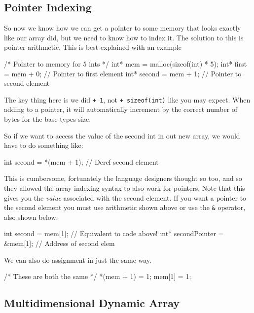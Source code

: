 \subsection{Pointer Indexing}

So now we know how we can get a pointer to some memory that looks exactly like our array did, but we need to know how to index it.
The solution to this is pointer arithmetic.
This is best explained with an example

\begin{codeblock}
/* Pointer to memory for 5 ints */
int* mem = malloc(sizeof(int) * 5); 
int* first = mem + 0; // Pointer to first element 
int* second = mem + 1; // Pointer to second element
\end{codeblock}

The key thing here is we did \texttt{+ 1}, not \texttt{+ sizeof(int)} like you may expect.
When adding to a pointer, it will automatically increment by the correct number of bytes for the base types size.

So if we want to access the value of the second int in out new array, we would have to do something like:

\begin{codeinline}
int second = *(mem + 1); // Deref second element
\end{codeinline}

This is cumbersome, fortunately the language designers thought so too, and so they allowed the array indexing syntax to also work for pointers.
Note that this gives you the \emph{value} associated with the second element.
If you want a pointer to the second element you must use arithmetic shown above or use the \texttt{\&} operator, also shown below.

\begin{codeinline}
int second = mem[1]; // Equivalent to code above!
int* secondPointer = \&mem[1]; // Address of second elem
\end{codeinline}

We can also do assignment in just the same way.

\begin{codeblock}
/* These are both the same */
*(mem + 1) = 1;
mem[1] = 1; 
\end{codeblock}

\subsection{Multidimensional Dynamic Array}

